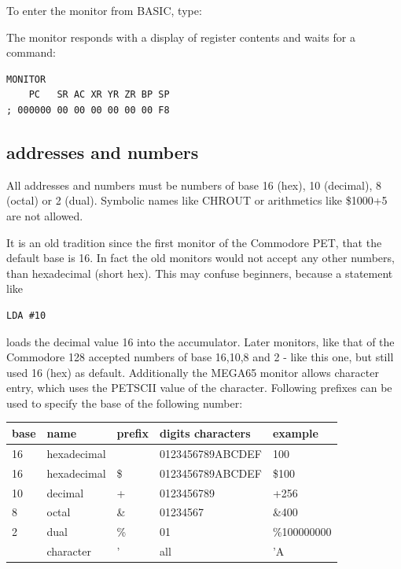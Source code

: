 To enter the monitor from BASIC, type:

The monitor responds with a display of register contents and waits for a command:

\begin{tcolorbox}[colback=blue,coltext=white]
\verbatimfont{\codefont}
\begin{verbatim}
MONITOR
    PC   SR AC XR YR ZR BP SP
; 000000 00 00 00 00 00 00 F8
\end{verbatim}
\end{tcolorbox}

\subsection{addresses and numbers}

All addresses and numbers must be numbers of base 16 (hex),
10 (decimal), 8 (octal) or 2 (dual). Symbolic names like CHROUT
or arithmetics like \$1000+5 are not allowed.

It is an old tradition since the first monitor of the Commodore PET,
that the default base is 16. In fact the old monitors would not
accept any other numbers, than hexadecimal (short hex).
This may confuse beginners, because a statement like
\begin{verbatim}
LDA #10
\end{verbatim}
loads the decimal value 16 into the accumulator.
Later monitors, like that of the Commodore 128 accepted numbers of
base 16,10,8 and 2 - like this one, but still used 16 (hex) as default.
Additionally the MEGA65 monitor allows character entry, which uses
the PETSCII value of the character.
Following prefixes can be used to specify the base of the following number:

{\ttfamily
{\setlength{\tabcolsep}{1mm}
\begin{center}
\begin{tabular}{|l|l|l|l|l|}
\hline
 base  & name & prefix & digits characters & example     \\
\hline
16 & hexadecimal  &     & 0123456789ABCDEF &   100       \\
16 & hexadecimal  & \$  & 0123456789ABCDEF & \$100       \\
10 & decimal      &  +  & 0123456789       & +256        \\
 8 & octal        & \&  & 01234567         & \&400       \\
 2 & dual         & \%  & 01               & \%100000000 \\
   & character    &  '  & all              & 'A          \\
\hline
\end{tabular}
\end{center}
}
}


